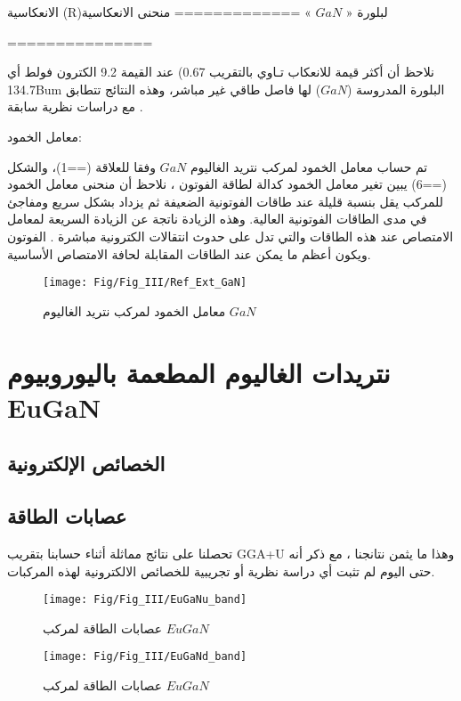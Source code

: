 الانعكاسية (R)لبلورة « $ GaN $ »
=============
منحنى الانعكاسية

===============

نلاحظ أن أكثر قيمة للانعكاب تـاوي بالتقريب 0.67) عند القيمة 9.2 الكترون فولط أي 134.7Bum البلورة المدروسة ($ GaN $) لها فاصل طاقي غير مباشر، وهذه النتائج تتطابق مع دراسات نظرية سابقة .

 معامل الخمود:

تم حساب معامل الخمود لمركب نتريد الغاليوم  $ GaN $ وفقا للعلاقة (==1)، والشكل (==6) يبين تغير معامل الخمود كدالة لطاقة الفوتون ، نلاحظ أن منحنى معامل الخمود للمركب يقل بنسبة قليلة عند طاقات الفوتونية الضعيفة ثم يزداد بشكل سريع ومفاجئ في مدى الطاقات الفوتونية العالية. وهذه الزيادة ناتجة عن الزيادة السريعة لمعامل الامتصاص عند هذه الطاقات والتي تدل على حدوث انتقالات الكترونية مباشرة .
الفوتون ويكون أعظم ما يمكن عند الطاقات المقابلة لحافة الامتصاص الأساسية.

\begin{figure}[h!]
	\centering
	\texttt{[image: Fig/Fig\_III/Ref\_Ext\_GaN]}
	\caption{ معامل الخمود لمركب نتريد الغاليوم  $ GaN $ }
	\label{fig:refextgan}
\end{figure}
\FloatBarrier

\section{  نتريدات الغاليوم المطعمة باليوروبيوم EuGaN }
\subsection*{الخصائص الإلكترونية }

\subsection*{عصابات الطاقة}
تحصلنا على نتائج مماثلة أثناء حسابنا بتقريب GGA+U وهذا ما يثمن نتانجنا ، مع ذكر أنه حتى اليوم لم تثبت أي دراسة نظرية أو تجريبية للخصائص الالكترونية لهذه المركبات.

\begin{figure}[h!]
	\centering
	\texttt{[image: Fig/Fig\_III/EuGaNu\_band]}
	\caption{ عصابات الطاقة لمركب $  EuGaN $ }
	\label{fig:euganuband}
\end{figure}
\FloatBarrier

\begin{figure}[h!]
	\centering
	\texttt{[image: Fig/Fig\_III/EuGaNd\_band]}
	\caption{ عصابات الطاقة لمركب $  EuGaN $ }
	\label{fig:euganuband}
\end{figure}
\FloatBarrier

